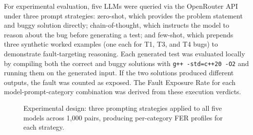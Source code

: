 For experimental evaluation, five LLMs were queried via the OpenRouter API under three prompt strategies: zero-shot, which provides the problem statement and buggy solution directly; chain-of-thought, which instructs the model to reason about the bug before generating a test; and few-shot, which prepends three synthetic worked examples (one each for T1, T3, and T4 bugs) to demonstrate fault-targeting reasoning. Each generated test was evaluated locally by compiling both the correct and buggy solutions with \texttt{g++ -std=c++20 -O2} and running them on the generated input. If the two solutions produced different outputs, the fault was counted as exposed. The Fault Exposure Rate for each model-prompt-category combination was derived from these execution verdicts.

\begin{figure}[h!]
\centering
{}
\caption{Experimental design: three prompting strategies applied to all five models across 1,000 pairs, producing per-category FER profiles for each strategy.}
\label{fig:exp_design}
\end{figure}

